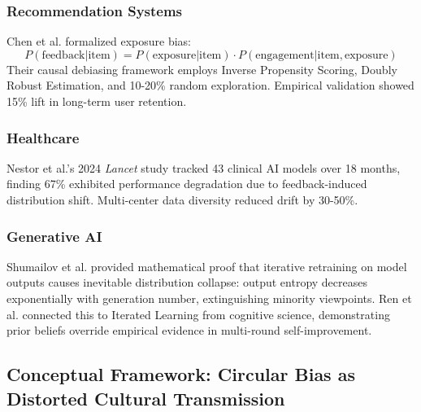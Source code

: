 \documentclass[11pt]{article}
\begin{document}
\subsubsection{Recommendation Systems}

Chen et al.\cite{chen2023} formalized exposure bias: 
\begin{equation}
P(\text{feedback} | \text{item}) = P(\text{exposure} | \text{item}) \cdot P(\text{engagement} | \text{item}, \text{exposure})
\end{equation}
Their causal debiasing framework employs Inverse Propensity Scoring, Doubly Robust Estimation, and 10-20\% random exploration. Empirical validation showed 15\% lift in long-term user retention.

\subsubsection{Healthcare}

Nestor et al.'s\cite{nestor2024} 2024 \textit{Lancet} study tracked 43 clinical AI models over 18 months, finding 67\% exhibited performance degradation due to feedback-induced distribution shift. Multi-center data diversity reduced drift by 30-50\%\cite{varoquaux2022}.

\subsubsection{Generative AI}

Shumailov et al.\cite{shumailov2024} provided mathematical proof that iterative retraining on model outputs causes inevitable distribution collapse: output entropy decreases exponentially with generation number, extinguishing minority viewpoints. Ren et al.\cite{ren2024} connected this to Iterated Learning from cognitive science, demonstrating prior beliefs override empirical evidence in multi-round self-improvement.

\subsection{Conceptual Framework: Circular Bias as Distorted Cultural Transmission}
\end{document}
